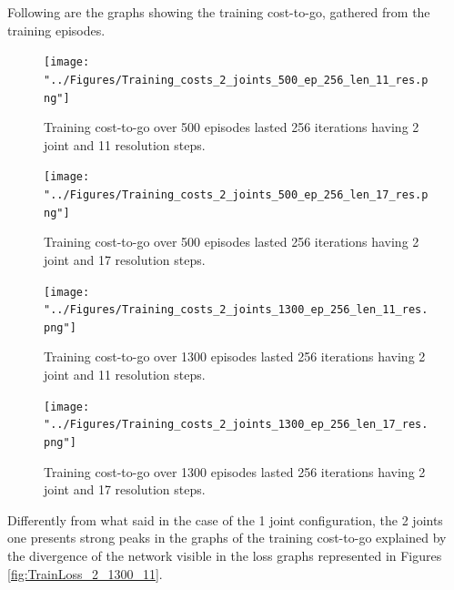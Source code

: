 \documentclass[twocolumn, a4paper]{article}
\begin{document}
Following are the graphs showing the training cost-to-go, gathered from the
training episodes.

\begin{figure}[H]
	\centering
	\texttt{[image: "../Figures/Training\_costs\_2\_joints\_500\_ep\_256\_len\_11\_res.png"]}
	\caption{Training cost-to-go over 500 episodes lasted 256 iterations having 2
			 joint and 11 resolution steps.}
	\label{fig:Train_cost_to_go_2_500_11}
\end{figure}

\begin{figure}[H]
	\centering
	\texttt{[image: "../Figures/Training\_costs\_2\_joints\_500\_ep\_256\_len\_17\_res.png"]}
	\caption{Training cost-to-go over 500 episodes lasted 256 iterations having 2
			 joint and 17 resolution steps.}
	\label{fig:Train_cost_to_go_2_500_17}
\end{figure}

\begin{figure}[H]
	\centering
	\texttt{[image: "../Figures/Training\_costs\_2\_joints\_1300\_ep\_256\_len\_11\_res.png"]}
	\caption{Training cost-to-go over 1300 episodes lasted 256 iterations having 2
			 joint and 11 resolution steps.}
	\label{fig:Train_cost_to_go_2_1300_11}
\end{figure}
\vspace{-1cm}

\begin{figure}[H]
	\centering
	\texttt{[image: "../Figures/Training\_costs\_2\_joints\_1300\_ep\_256\_len\_17\_res.png"]}
	\caption{Training cost-to-go over 1300 episodes lasted 256 iterations having 2
			 joint and 17 resolution steps.}
	\label{fig:Train_cost_to_go_2_1300_17}
\end{figure}

Differently from what said in the case of the 1 joint configuration,
the 2 joints one presents strong peaks in the graphs of the training cost-to-go
explained by the divergence of the network visible in the loss graphs 
represented in Figures \ref{fig:TrainLoss_2_1300_11}.
\end{document}

